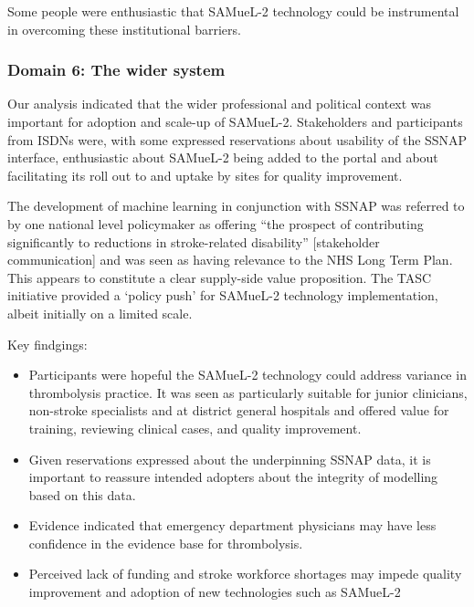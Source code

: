 Some people were enthusiastic that SAMueL-2 technology could be instrumental in overcoming these institutional barriers.

\subsubsection{Domain 6: The wider system}

Our analysis indicated that the wider professional and political context was important for adoption and scale-up of SAMueL-2. Stakeholders and participants from ISDNs were, with some expressed reservations about usability of the SSNAP interface, enthusiastic about SAMueL-2 being added to the portal and about facilitating its roll out to and uptake by sites for quality improvement.

The development of machine learning in conjunction with SSNAP was referred to by one national level policymaker as offering “the prospect of contributing significantly to reductions in stroke-related disability” [stakeholder communication] and was seen as having relevance to the NHS Long Term Plan. This appears to constitute a clear supply-side value proposition. The TASC initiative provided a ‘policy push’ for SAMueL-2 technology implementation, albeit initially on a limited scale.

Key findgings:

\begin{itemize}
    \item Participants were hopeful the SAMueL-2 technology could address variance in thrombolysis practice. It was seen as particularly suitable for junior clinicians, non-stroke specialists and at district general hospitals and offered value for training, reviewing clinical cases, and quality improvement.

    \item Given reservations expressed about the underpinning SSNAP data, it is important to reassure intended adopters about the integrity of modelling based on this data.

    \item Evidence indicated that emergency department physicians may have less confidence in the evidence base for thrombolysis.

    \item Perceived lack of funding and stroke workforce shortages may impede quality improvement and adoption of new technologies such as SAMueL-2

\end{itemize}




